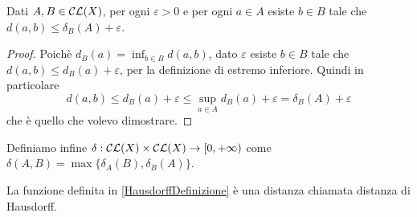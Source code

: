 \begin{lemma}\label{ApprossimazioneDistanzaAsimmetrica}
	Dati $A,B\in \mathcal{CL}(X)$, per ogni $\varepsilon>0$ e per ogni $a\in A$ esiste $b\in B$ tale che $d(a,b)\le \delta_B(A)+\varepsilon$.
\end{lemma}
\begin{proof}
	Poichè $d_B(a)=\inf_{b\in B}d(a,b)$, dato $\varepsilon$ esiste $b\in B$ tale che $d(a,b)\le d_B(a)+\varepsilon$, per la definizione di estremo inferiore. Quindi in particolare
	\begin{equation*}
		d(a,b)\le d_B(a)+\varepsilon\le \sup_{a\in A}d_B(a)+\varepsilon=\delta_B(A)+\varepsilon
	\end{equation*}
	che è quello che volevo dimostrare.
\end{proof}



\begin{definition}\label{HausdorffDefinizione}
	Definiamo infine $\delta:\mathcal{CL}(X)\times \mathcal{CL}(X) \to [0,+\infty)$ come $\delta(A,B)=\max\{ \delta_A(B),\delta_B(A) \}$.
\end{definition}

\begin{theorem}
	La funzione definita in \cref{HausdorffDefinizione} è una distanza chiamata distanza di Hausdorff.
\end{theorem}

